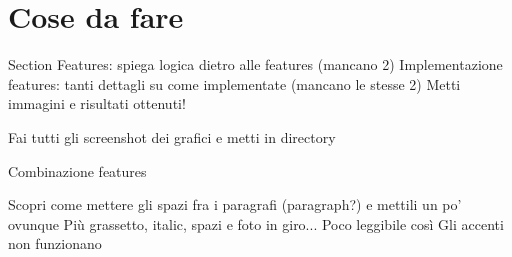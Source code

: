 \documentclass{article}
\begin{document}
		\section{Cose da fare}
		Section Features: spiega logica dietro alle features (mancano 2)
		Implementazione features: tanti dettagli su come implementate (mancano le stesse 2)
		Metti immagini e risultati ottenuti! 
		
		Fai tutti gli screenshot dei grafici e metti in directory
		
		Combinazione features
		
		Scopri come mettere gli spazi fra i paragrafi (paragraph?) e mettili un po' ovunque
		Più grassetto, italic, spazi e foto in giro... Poco leggibile così
		Gli accenti non funzionano
		
\end{document}
